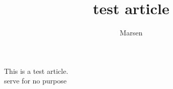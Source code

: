 \documentclass{article}
\title{test article}
\author{Marsen}
\begin{document}
This is a test article. \\
serve for no purpose
\end{document}
